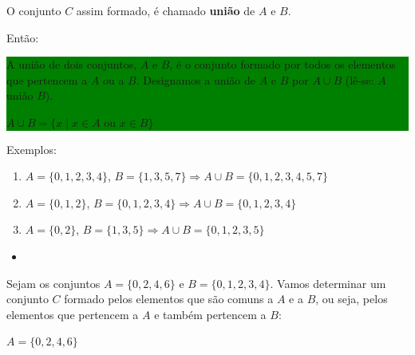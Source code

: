 \documentclass[11pt, openright, a4paper, brazil, english, french, spanish, bibjustif, openany, oneside]{abntex2}
\begin{document}
\begin{SingleSpace}
\begin{center}
\begin{minipage}{.3\linewidth}
\end{minipage}

\end{center}

O conjunto $C$ assim formado, é chamado \textbf{união} de $A$ e $B$.

Então:

\colorbox{green}
{
\begin{minipage}{14.7cm}

A união de dois conjuntos, $A$ e $B$, é o conjunto formado por todos os elementos que pertencem a $A$ ou a $B$.
Designamos a união de $A$ e $B$ por $A \cup B$ (lê-se: $A$ união $B$).

$A \cup B=\{x \mid x \in A$ ou $x \in B\}$

\end{minipage}
}

Exemplos:

\begin{enumerate}[label=\alph*)]

\item $A=\{0, 1, 2, 3, 4\}$, $B=\{1, 3, 5, 7\} \Rightarrow A \cup B=\{0, 1, 2, 3, 4, 5, 7\}$

\item $A=\{0, 1, 2\}$, $B=\{ 0, 1, 2, 3, 4\} \Rightarrow A \cup B=\{0, 1, 2, 3, 4\}$

\item $A=\{0, 2\}$, $B=\{1, 3, 5\} \Rightarrow A \cup B=\{0, 1, 2, 3, 5\}$

\end{enumerate}

\vspace{.5cm}

\begin{itemize}

\item \textbf{}

\end{itemize}

Sejam os conjuntos $A=\{0, 2, 4, 6\}$ e $B=\{0, 1, 2, 3, 4\}$.
Vamos determinar um conjunto $C$ formado pelos elementos que são comuns a $A$ e a $B$, ou seja, pelos elementos que pertencem a $A$ e também pertencem a $B$:


\begin{center}
\begin{minipage}{.3\linewidth}

\begin{flushright}

$A=\{0, 2, 4, 6\}$


\end{flushright}
\end{minipage}
\end{center}
\end{SingleSpace}
\end{document}
